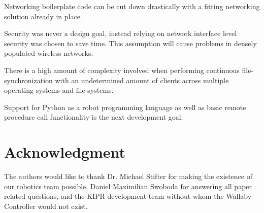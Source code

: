 \documentclass[conference,a4paper]{IEEEtran}
\begin{document}
Networking boilerplate code can be cut down drastically with a fitting networking solution already in place.

Security was never a design goal, instead relying on network interface level security was chosen to save time. This assumption will cause problems in densely populated wireless networks.

There is a high amount of complexity involved when performing continuous file-synchronization with an undetermined amount of clients across multiple operating-systems and file-systems.

Support for Python\cite{Python:Python Foundation} as a robot programming language as well as basic remote procedure call functionality is the next development goal.

\section*{Acknowledgment}
The authors would like to thank Dr. Michael Stifter for making the existence of our robotics team possible, Daniel Maximilian Swoboda for answering all paper related questions, and the KIPR development team without whom the Wallaby\cite{Wallaby Controller:KIPR} Controller would not exist.
\end{document}
